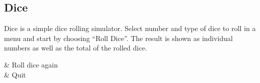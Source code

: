 \subsection{Dice}
Dice is a simple dice rolling simulator. Select number and type of dice to roll
in a menu and start by choosing ``Roll Dice''. The result is shown as individual
numbers as well as the total of the rolled dice.

\begin{btnmap}
    \PluginSelect
        & Roll dice again\\

        & Quit\\
\end{btnmap}
